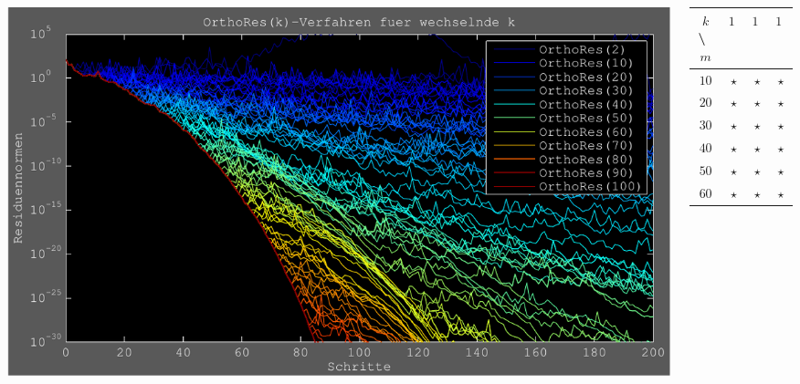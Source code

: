 \documentclass[aspectratio=43,10pt,ucs]{beamer} %
\begin{document}
\begin{frame}
{  \begin{columns}
    \begin{column}{.5\textwidth}
      \begin{center}
        \includegraphics[width=\textwidth]{pics/OrthoResK}
      \end{center}
    \end{column}
    \begin{column}{.4\textwidth}
      \begin{center}
        \begin{tabular}{cccc}
          $k$ \textbackslash\ $m$ & $120$ & $140$ & $160$ \\\hline
          $10$ & $\star$ & $\star$ & $\star$ \\
          $20$ & $\star$ & $\star$ & $\star$ \\
          $30$ & $\star$ & $\star$ & $\star$ \\
          $40$ & $\star$ & $\star$ & $\star$ \\
          $50$ & $\star$ & $\star$ & $\star$ \\
          $60$ & $\star$ & $\star$ & $\star$ \\
        \end{tabular}
      \end{center}
    \end{column}
  \end{columns}}

\end{frame}
\end{document}
